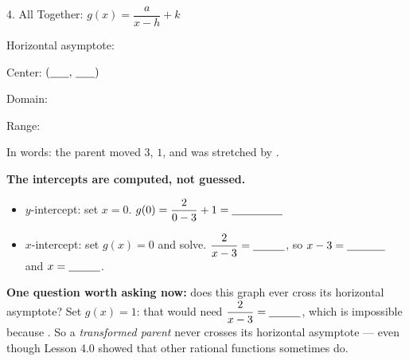 \documentclass[10pt]{article}
\begin{document}
\begin{notesbox}{4. All Together: $g(x)=\dfrac{a}{x-h}+k$}
\begin{center}
\begin{minipage}{0.48\linewidth}
Horizontal asymptote: \blank{1.4cm}

Center: $(\blank{0.6cm},\,\blank{0.6cm})$

\vspace{3pt}
Domain: \blank{2.6cm}

Range: \blank{2.6cm}

\vspace{3pt}
In words: the parent moved \blank{1.2cm} $3$, \blank{1.2cm} $1$, and was stretched by
\blank{0.8cm}.
\end{minipage}
\end{center}

\vspace{2pt}
\textbf{The intercepts are computed, not guessed.}
\begin{itemize}[leftmargin=1.5em, itemsep=3pt]
  \item $y$-intercept: set $x=0$. \; $g(0)=\dfrac{2}{0-3}+1=\blank{1.6cm}$
  \item $x$-intercept: set $g(x)=0$ and solve. \; $\dfrac{2}{x-3}=\blank{1.0cm}$, \; so
        $x-3=\blank{1.2cm}$ and $x=\blank{1.0cm}$.
\end{itemize}

\vspace{3pt}
\textbf{One question worth asking now:} does this graph ever cross its horizontal asymptote? Set
$g(x)=1$: that would need $\dfrac{2}{x-3}=\blank{1.0cm}$, which is impossible because
\blank{4.4cm}. So a \emph{transformed parent} never crosses its horizontal asymptote --- even though
Lesson 4.0 showed that other rational functions sometimes do.
\end{notesbox}
\end{document}
